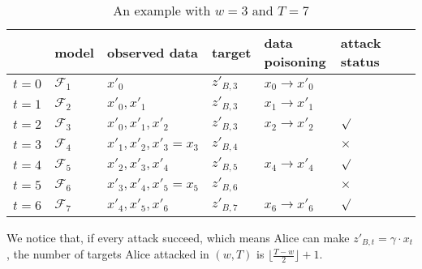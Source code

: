 \documentclass[journal]{IEEEtran}
\newtheorem{definition}{Definition}
\begin{document}
\begin{table}[!htbp]
\begin{tabular}{|l|l|l|l|l|l|l|l|}
\hline
      & model         & observed data & target         & data poisoning & attack status  \\ \hline
$t=0$   & $\mathcal{F}_1$   & $x'_0$              & $z'_{B,3}$    & $x_0\to x'_0$   &          \\ \hline
$t=1$   & $\mathcal{F}_2$   & $x'_0, x'_1$         & $z'_{B,3}$    & $x_1\to x'_1$  &          \\ \hline
$t=2$   & $\mathcal{F}_3$   & $x'_0, x'_1, x'_2$    & $z'_{B,3}$   & $x_2\to x'_2$  & $\surd$ \\ \hline
$t=3$   & $\mathcal{F}_4$   & $x'_1, x'_2, x'_3=x_3$ & $z'_{B,4}$   &                & $\times$ \\ \hline
$t=4$   & $\mathcal{F}_5$   & $x'_2, x'_3, x'_4$    & $z'_{B,5}$   & $x_4\to x'_4$  & $\surd$ \\ \hline
$t=5$   & $\mathcal{F}_6$   & $x'_3, x'_4, x'_5=x_5$ & $z'_{B,6}$   &              & $\times$  \\ \hline
$t=6$   & $\mathcal{F}_7$   & $x'_4, x'_5, x'_6$    & $z'_{B,7}$   & $x_6\to x'_6$  & $\surd$ \\ \hline
\end{tabular}
\caption{An example with $w=3$ and $T=7$}
\label{table:basic}
\end{table}





We notice that, if every attack succeed, which means Alice can make $z'_{B,t}=\gamma \cdot x_t$, the number of targets Alice attacked in $(w,T)$ is $\lfloor \frac{T-w}{2} \rfloor +1$. 
\end{document}
